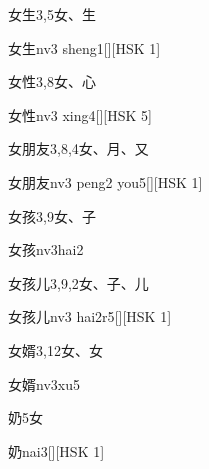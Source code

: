 \begin{entry}{女生}{3,5}{⼥、⽣}
  \begin{phonetics}{女生}{nv3 sheng1}[][HSK 1]
  \end{phonetics}
\end{entry}

\begin{entry}{女性}{3,8}{⼥、⼼}
  \begin{phonetics}{女性}{nv3 xing4}[][HSK 5]
  \end{phonetics}
\end{entry}

\begin{entry}{女朋友}{3,8,4}{⼥、⽉、⼜}
  \begin{phonetics}{女朋友}{nv3 peng2 you5}[][HSK 1]
  \end{phonetics}
\end{entry}

\begin{entry}{女孩}{3,9}{⼥、⼦}
  \begin{phonetics}{女孩}{nv3hai2}
  \end{phonetics}
\end{entry}

\begin{entry}{女孩儿}{3,9,2}{⼥、⼦、⼉}
  \begin{phonetics}{女孩儿}{nv3 hai2r5}[][HSK 1]
  \end{phonetics}
\end{entry}

\begin{entry}{女婿}{3,12}{⼥、⼥}
  \begin{phonetics}{女婿}{nv3xu5}
  \end{phonetics}
\end{entry}

\begin{entry}{奶}{5}{⼥}
  \begin{phonetics}{奶}{nai3}[][HSK 1]
  \end{phonetics}
\end{entry}

